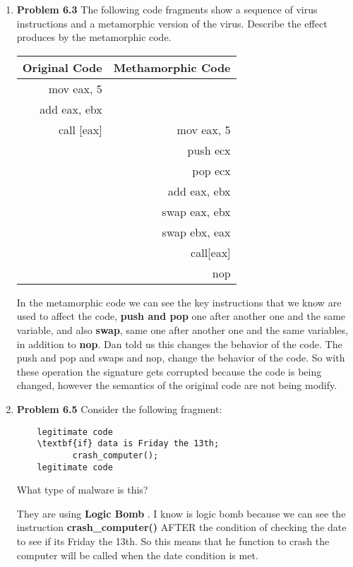 \documentclass[12pt]{article}
\begin{document}
\begin{enumerate}
	\item {\textbf{Problem 6.3}  The following code fragments show a sequence of virus instructions and a metamorphic version of the virus. Describe the effect produces by the metamorphic code. }
\begin{center}
  \begin{tabular}{ | r | r | }
    \hline
     \textbf{Original Code}&\textbf{Methamorphic Code}\\ \hline
    mov eax, 5 \\  add eax, ebx  \\call [eax]    & 
     mov eax, 5\\  & push ecx \\ & pop ecx \\ & add eax, ebx \\ & swap eax, ebx \\ & swap ebx, eax  \\ & call[eax] \\ & nop\\ \hline
    
  \end{tabular}
\end{center}

In the metamorphic code we can see the key instructions that we know are used to affect the code, \textbf{push and pop} one after another one and the same variable, and also \textbf{swap}, same one after another one and the same variables, in addition to \textbf{nop}. Dan told us this changes the behavior of the code. The push and pop and swaps and nop, change the behavior of the code. So with these operation the signature gets corrupted because the code is being changed, however the semantics of the original code are not being modify. 
	 

	\vspace{10pt}
	
	\item {\textbf{Problem 6.5} Consider the following fragment: 
	\begin{verbatim}
	legitimate code
	\textbf{if} data is Friday the 13th;
	       crash_computer();
	legitimate code \end{verbatim} What type of malware is this?}
	
	They are using \textbf{Logic Bomb} . I know is logic bomb because we can see the instruction \textbf{crash\_computer()} AFTER the condition of checking the date to see if its Friday the 13th. So this means that he function to crash the computer will be called when the date condition is met. 
	

\end{enumerate}
\end{document}
